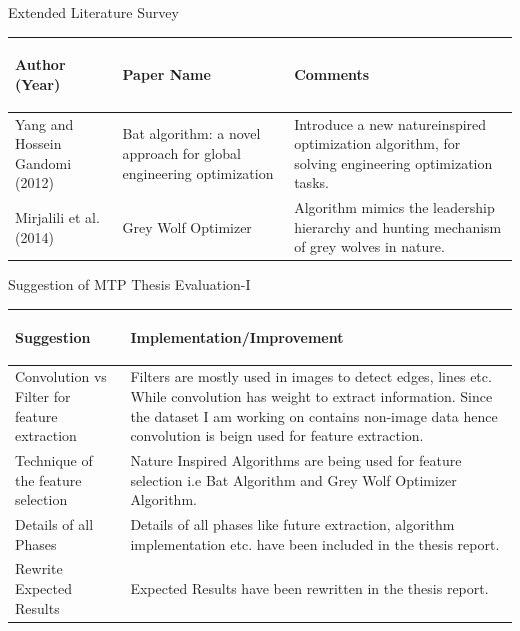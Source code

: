\documentclass{beamer}
\begin{document}
\begin{frame}{Extended Literature Survey}
\begin{tabular}{ | p{1.5cm} | p{3.8cm} | p{5cm}| } 

\hline 
{\bf \begin{center} \footnotesize{Author (Year)} \end{center}} & {\bf \begin{center} \footnotesize{Paper Name} \end{center}} & {\bf \begin{center} \footnotesize{Comments} \end{center}} \\
\hline
\footnotesize{Yang and Hossein Gandomi (2012)} & \footnotesize{Bat algorithm: a novel approach for global engineering optimization} & \footnotesize{Introduce a new natureinspired optimization algorithm, for solving engineering optimization tasks.}\\


\hline
\footnotesize{Mirjalili et al. (2014)} & \footnotesize{Grey Wolf Optimizer} & \footnotesize{Algorithm mimics the
leadership hierarchy and hunting mechanism of grey wolves in nature.} \\ 
\hline

\end{tabular}
\end{frame}

\begin{frame}{Suggestion of MTP Thesis Evaluation-I}
\begin{center}
\begin{tabular}{ | p{3cm} | p{7cm}| } 
\hline 
{\bf \begin{center} \footnotesize{Suggestion} \end{center}} & {\bf \begin{center} \footnotesize{Implementation/Improvement} \end{center}}\\
\hline
\footnotesize{Convolution vs Filter for feature extraction} & \footnotesize{Filters are mostly used in images to detect edges, lines etc. While convolution has weight to extract information. Since the dataset I am working on contains non-image data hence convolution is beign used for feature extraction.}\\ 
\hline
\footnotesize{Technique of the feature selection }& \footnotesize{Nature Inspired Algorithms are being used for feature selection i.e Bat Algorithm and Grey Wolf Optimizer Algorithm.}  \\ 
\hline
\footnotesize{Details of all Phases} & \footnotesize{Details of all phases like future extraction, algorithm implementation etc. have been included in the thesis report.}\\ 
\hline
\footnotesize{Rewrite Expected Results}& \footnotesize{Expected Results have been rewritten in the thesis report.}\\ 
\hline
\end{tabular}
\end{center}
\end{frame}
\end{document}
